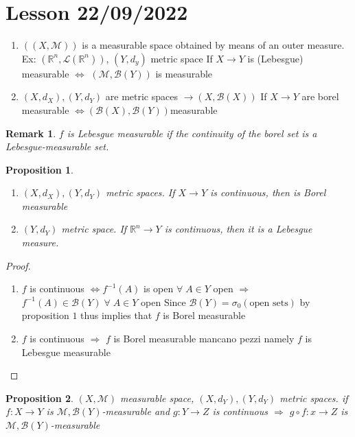 \documentclass[a4paper,12pt]{article}
\theoremstyle{break}
\newtheorem{proposition}{Proposition}[section]
\newtheorem{remark}[section]{Remark}
\numberwithin{equation}{section}
\begin{document}
\section{Lesson 22/09/2022}
\begin{enumerate}
    \item  \(((X, \mathcal{M}))\) is a measurable space obtained by means of an outer measure. Ex: \((\mathbb{R}^n, \mathcal{L}(\mathbb{R}^n))\), \((Y, d_y)\) metric space
    If \(X \to Y\) is (Lebesgue) measurable \(\Longleftrightarrow\) \((\mathcal{M}, \mathcal{B}(Y))\) is measurable
    \item \((X, d_X), (Y, d_Y)\) are metric spaces \(\longrightarrow (X, \mathcal{B}(X))\)
    If \(X \to Y\) are borel measurable \(\Longleftrightarrow (\mathcal{B}(X), \mathcal{B}(Y)) \)measurable
\end{enumerate}
\begin{remark}
     \(f\) is Lebesgue measurable if the continuity of the borel set is a Lebesgue-measurable set.
\end{remark}
\begin{proposition}
    \begin{enumerate}
        \item \((X, d_X), (Y, d_Y)\) metric spaces. If \(X \to Y\) is continuous, then is Borel measurable
        \item \((Y, d_Y)\) metric space. If \(\mathbb{R}^n \to Y\) is continuous, then it is a Lebesgue measure.
    \end{enumerate}
\end{proposition}
\begin{proof}
    \begin{enumerate}
        \item \(f\) is continuous \(\Longleftrightarrow f^{-1}(A)\) is open \(\forall \; A \in Y\)
        open \(\Longrightarrow\) \(f^{-1}(A) \in \mathcal{B}(Y) \; \forall \; A \in Y\) open
        Since \(\mathcal{B}(Y) = \sigma_0(\mbox{open sets})\) by proposition \(1\) thus implies that \(f\) is Borel measurable
        \item \(f\) is continuous \(\Longrightarrow\) \(f\) is Borel measurable
        mancano pezzi namely \(f\) is Lebesgue measurable
    \end{enumerate}
\end{proof}
\begin{proposition}
    \((X, \mathcal{M})\) measurable space, \((X, d_Y), (Y, d_Y)\) metric spaces. 
    if \(f: X \to Y\) is \(\mathcal{M}, \mathcal{B}(Y)\)-measurable and \(g : Y \to Z\) is continuous \(\Longrightarrow\) \(g \circ f : x \to Z\) is \(\mathcal{M}, \mathcal{B}(Y)\)-measurable
\end{proposition}
\end{document}
